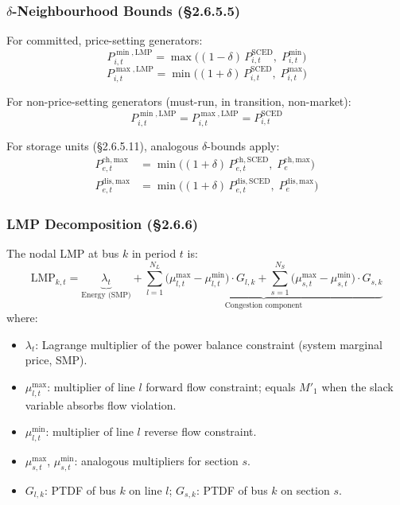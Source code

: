\subsubsection{\texorpdfstring{$\delta$-Neighbourhood Bounds}{delta-Neighbourhood Bounds} (§2.6.5.5)}\label{sec:lmp-delta}

For committed, price-setting generators:
\begin{equation}\label{eq:delta-gen}
  P^{\min,\mathrm{LMP}}_{i,t} = \max\!\bigl((1-\delta)\,P^{\mathrm{SCED}}_{i,t},\;
  P^{\min}_{i,t}\bigr)
\end{equation}
\begin{equation}\label{eq:delta-gen-ub}
  P^{\max,\mathrm{LMP}}_{i,t} = \min\!\bigl((1+\delta)\,P^{\mathrm{SCED}}_{i,t},\;
  P^{\max}_{i,t}\bigr)
\end{equation}

For non-price-setting generators (must-run, in transition, non-market):
\begin{equation}
  P^{\min,\mathrm{LMP}}_{i,t} = P^{\max,\mathrm{LMP}}_{i,t} = P^{\mathrm{SCED}}_{i,t}
\end{equation}

For storage units (§2.6.5.11), analogous $\delta$-bounds apply:
\begin{align}
  P^{\mathrm{ch,max}}_{e,t} &= \min\!\bigl((1+\delta)\,P^{\mathrm{ch,SCED}}_{e,t},\;
    P^{\mathrm{ch,max}}_e\bigr) \\
  P^{\mathrm{dis,max}}_{e,t} &= \min\!\bigl((1+\delta)\,P^{\mathrm{dis,SCED}}_{e,t},\;
    P^{\mathrm{dis,max}}_e\bigr)
\end{align}

\subsubsection{LMP Decomposition (§2.6.6)}\label{sec:lmp-decomp}

The nodal LMP at bus $k$ in period $t$ is:
\begin{equation}\label{eq:lmp-formula}
\boxed{
  \mathrm{LMP}_{k,t} =
  \underbrace{\lambda_t}_{\text{Energy (SMP)}}
  + \underbrace{
    \sum_{l=1}^{N_L}
    \bigl(\mu^{\max}_{l,t} - \mu^{\min}_{l,t}\bigr) \cdot G_{l,k}
    + \sum_{s=1}^{N_S}
    \bigl(\mu^{\max}_{s,t} - \mu^{\min}_{s,t}\bigr) \cdot G_{s,k}
  }_{\text{Congestion component}}
}
\end{equation}
where:
\begin{itemize}[nosep]
  \item $\lambda_t$: Lagrange multiplier of the power balance constraint
        (system marginal price, SMP).
  \item $\mu^{\max}_{l,t}$: multiplier of line $l$ forward flow constraint;
        equals $M'_1$ when the slack variable absorbs flow violation.
  \item $\mu^{\min}_{l,t}$: multiplier of line $l$ reverse flow constraint.
  \item $\mu^{\max}_{s,t}$, $\mu^{\min}_{s,t}$: analogous multipliers for
        section $s$.
  \item $G_{l,k}$: PTDF of bus $k$ on line $l$; $G_{s,k}$: PTDF of bus $k$
        on section $s$.
\end{itemize}

